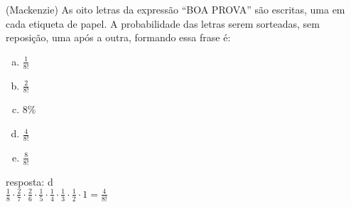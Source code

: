 \begin{ex}
(Mackenzie) As oito letras da expressão “BOA PROVA” são escritas, uma em cada etiqueta de papel. A probabilidade das letras serem sorteadas, sem reposição, uma após a outra, formando essa frase é:
   \begin{enumerate}[(a)]
   \item $\frac{1}{8!}$
   \item $\frac{2}{8!}$
   \item 8\%
   \item $\frac{4}{8!}$
   \item $\frac{8}{8!}$
   \end{enumerate}
     \begin{sol} 
      resposta: d \\
      $\frac{1}{8}\cdot\frac{2}{7}\cdot\frac{2}{6}\cdot\frac{1}{5}\cdot\frac{1}{4}\cdot\frac{1}{3}\cdot\frac{1}{2}\cdot1=\frac{4}{8!}$
     \end{sol}
\end{ex}